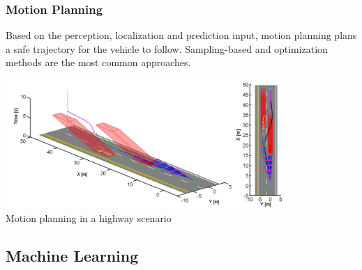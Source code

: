 \begin{frame}
\frametitle{Motion Planning}
Based on the perception, localization and prediction input, motion planning
plans a safe trajectory for the vehicle to follow. Sampling-based and
optimization methods are the most common approaches.
\begin{center}
\includegraphics[width=0.8\textwidth]{images/ma_motionplanning.png}\\
\footnotesize{Motion planning in a highway scenario \cite{Ma2015}}
\end{center}
\end{frame}

\subsection{Machine Learning}

